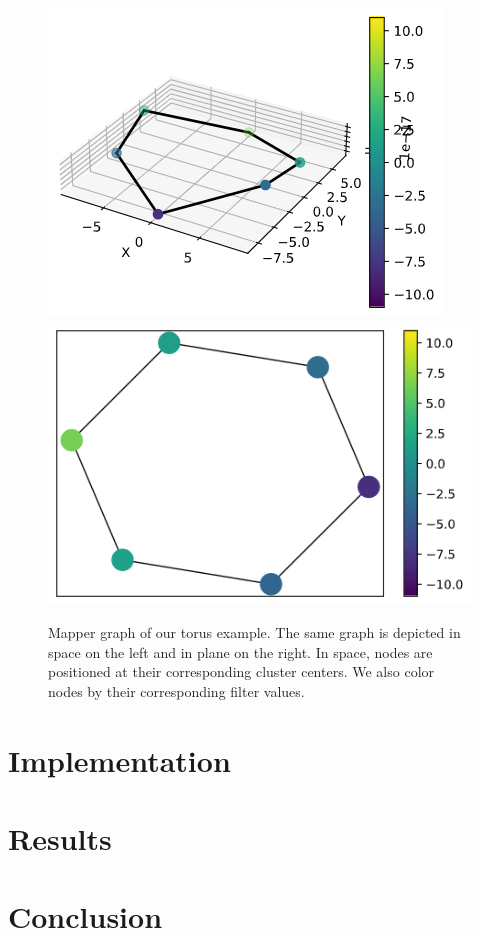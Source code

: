 \documentclass{article}
\begin{document}
\begin{figure}[ht]
    \centering
    \includegraphics[align=c, width=0.4\columnwidth]{torus-graph-3d}
    \includegraphics[align=c, width=0.4\columnwidth]{torus-graph-2d}
    \caption{Mapper graph of our torus example.
        The same graph is depicted in space on the left and in plane on the right.
        In space, nodes are positioned at their corresponding cluster centers.
        We also color nodes by their corresponding filter values.}
    \label{fig:torus-mapper}
\end{figure}

\section{Implementation}\label{sec:impl}

\section{Results}\label{sec:res}

\section{Conclusion}\label{sec:concl}



\end{document}
